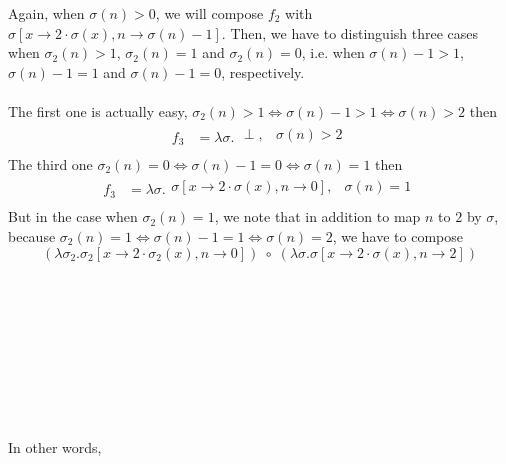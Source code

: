 \documentclass{article}
\begin{document}
Again, when $\sigma(n)>0$, we will compose $f_2$ with $\sigma[x\rightarrow 2 \cdot \sigma(x), n \rightarrow \sigma(n)-1]$. Then, we have to distinguish three cases when $\sigma_2(n) > 1$, $\sigma_2(n) = 1$ and $\sigma_2(n) = 0$, i.e. when $\sigma(n)-1 > 1$, $\sigma(n)-1 = 1$ and $\sigma(n)-1 = 0$, respectively.\\ \\
The first one is actually easy, $\sigma_2(n) > 1 \iff \sigma(n)-1 > 1 \iff \sigma(n) > 2$ then\begin{align*}
f_3  &= \lambda \sigma . \left.
\begin{array}{ll}
      \perp, & \sigma(n) > 2 \\
\end{array} 
\right.
\end{align*}
The third one $\sigma_2(n) = 0 \iff \sigma(n)-1 = 0 \iff \sigma(n) = 1$ then 
\begin{align*}
f_3  &= \lambda \sigma . \left.
\begin{array}{ll}
      \sigma[x\rightarrow 2 \cdot \sigma(x), n \rightarrow 0], & \sigma(n) = 1 \\
\end{array} 
\right.
\end{align*}
But in the case when $\sigma_2(n) = 1$, we note that in addition to map $n$ to $2$ by $\sigma$, because $\sigma_2(n) = 1 \iff \sigma(n)-1 = 1 \iff \sigma(n)=2$, we have to compose $$(\lambda \sigma_2 . \sigma_2 [x \rightarrow 2 \cdot \sigma_2(x), n \rightarrow 0]) \; \circ \; (\lambda \sigma . \sigma [x \rightarrow 2 \cdot \sigma(x), n \rightarrow 2])$$\\ \\ \\ \\ \\ \\ \\ \\ \\
In other words,
\end{document}
